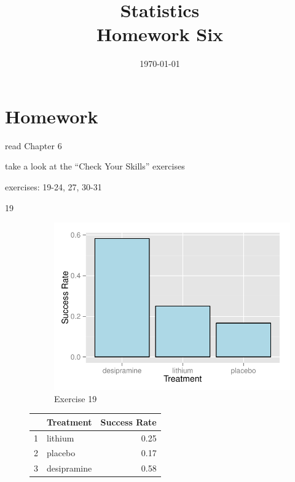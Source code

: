 \documentclass[letterpaper, landscape]{exam}
\title{Statistics \\ Homework Six}
\date{\today}
\author{}
\begin{document}
  \maketitle

  \section{Homework}
    \begin{itemize*}
      \item read Chapter 6 
      \item take a look at the ``Check Your Skills'' exercises
      \item exercises: 19-24, 27, 30-31
    \end{itemize*}

  \ifprintanswers
    \begin{description}

      \item[19]     
        \begin{figure}[H]
          \centering
          \includegraphics[scale = 0.8]{figures/ex19.pdf}
          \caption{Exercise 19}
        \end{figure}

        \begin{table}[H]
          \centering
          \begin{tabular}{rlr}
            \toprule
              & Treatment   & Success Rate \\
            \midrule
            1 & lithium     & 0.25 \\
            2 & placebo     & 0.17 \\
            3 & desipramine & 0.58 \\
            \bottomrule
          \end{tabular}
        \end{table}


\end{description}
\end{document}
